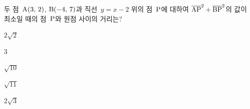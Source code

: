두 점~$\mathrm{A}(3,\mkern3mu 2)$, $\mathrm{B}(-4,\mkern3mu 7)$과 직선~$y=x-2$ 위의 점~$\mathrm{P}$에 대하여 $\overline{\mathrm{AP}}^2+\overline{\mathrm{BP}}^2$의 값이 최소일 때의 점~$\mathrm{P}$와 원점 사이의 거리는?
\begin{choices32}{\rule[-3ex]{0pt}{8ex}$2\sqrt{2}$}{\rule[-3ex]{0pt}{8ex}$3$}{\rule[-3ex]{0pt}{8ex}$\sqrt{10}$}{\rule[-3ex]{0pt}{8ex}$\sqrt{11}$}{\rule[-3ex]{0pt}{8ex}$2\sqrt{3}$}\end{choices32}
